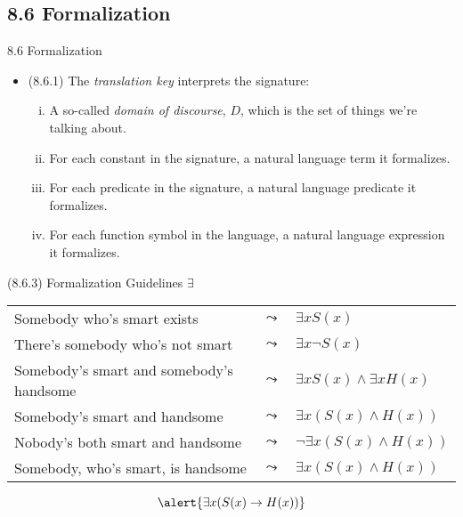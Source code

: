 \subsection{8.6 Formalization}
\begin{frame}{8.6 Formalization}

\begin{itemize}

	\item (8.6.1) The \emph{translation key} interprets the signature:
	
	\begin{enumerate}[(i)]
		
			\item A so-called \emph{domain of discourse}, $D$, which is the set of things we're talking about.
			
			\item For each constant in the signature, a natural language term it formalizes.
			
			\item For each predicate in the signature, a natural language predicate it formalizes.
			
			\item For each function symbol in the language, a natural language expression it formalizes.
			
		\end{enumerate}


\end{itemize}

\end{frame}

\begin{frame}{(8.6.3) Formalization Guidelines $\exists$}

\begin{tabular}{p{6.5cm} c l}
		
		Somebody who's smart exists & $\leadsto$ & $\exists x S(x)$\\

		
		There's somebody who's not smart & $\leadsto$ & $\exists x\neg S(x)$\\

Somebody's smart and somebody's handsome & $\leadsto$ & $\exists xS(x)\land \exists xH(x)$\\

Somebody's smart and handsome & $\leadsto$ & $\exists x(S(x)\land H(x))$\\
 Nobody's both smart and handsome & $\leadsto$ &$\neg\exists x(S(x)\land H(x))$\\
 
 Somebody, who's smart, is handsome & $\leadsto$ & $\exists x(S(x)\land H(x))$
		
		\end{tabular}
		
		\vspace{4ex}
		
		 \[\alert{\exists x(S(x)\to H(x))}\]

\end{frame}

